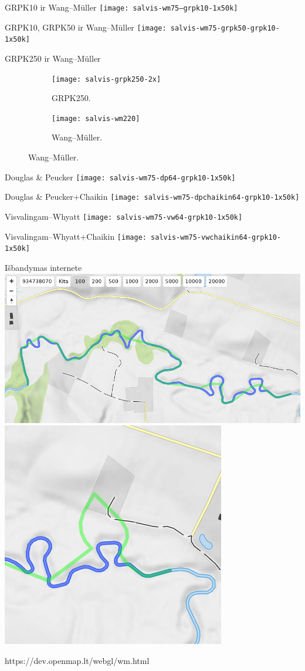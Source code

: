 \documentclass[14pt]{beamer}
\newcommand{\DP}{Douglas \& Peucker}
\newcommand{\VW}{Visvalingam--Whyatt}
\newcommand{\WM}{Wang--M{\"u}ller}
\begin{document}
\begin{frame}{GRPK10 ir {\WM}}
  \texttt{[image: salvis-wm75--grpk10-1x50k]}
\end{frame}

\begin{frame}{GRPK10, GRPK50 ir {\WM}}
  \texttt{[image: salvis-wm75-grpk50-grpk10-1x50k]}
\end{frame}

\begin{frame}{GRPK250 ir {\WM}}
  \begin{figure}[h!]
    \centering
    \begin{subfigure}[b]{.49\textwidth}
      \texttt{[image: salvis-grpk250-2x]}
      \caption{GRPK250.}
    \end{subfigure}
    \hfill
    \begin{subfigure}[b]{.49\textwidth}
      \centering
      \texttt{[image: salvis-wm220]}
      \caption{{\WM}.}
    \end{subfigure}
  \end{figure}
\end{frame}

\begin{frame}{{\DP}}
  \texttt{[image: salvis-wm75-dp64-grpk10-1x50k]}
\end{frame}

\begin{frame}{{\DP}+Chaikin}
  \texttt{[image: salvis-wm75-dpchaikin64-grpk10-1x50k]}
\end{frame}

\begin{frame}{{\VW}}
  \texttt{[image: salvis-wm75-vw64-grpk10-1x50k]}
\end{frame}

\begin{frame}{{\VW}+Chaikin}
  \texttt{[image: salvis-wm75-vwchaikin64-grpk10-1x50k]}
\end{frame}

\begin{frame}{Išbandymas internete}
  \centering
  \includegraphics[width=.75\textwidth]{openmap-wm-good.png}
  \includegraphics[width=.3\textwidth]{openmap-wm-bad.png}

  {\tiny https://dev.openmap.lt/webgl/wm.html}
\end{frame}

\end{document}
